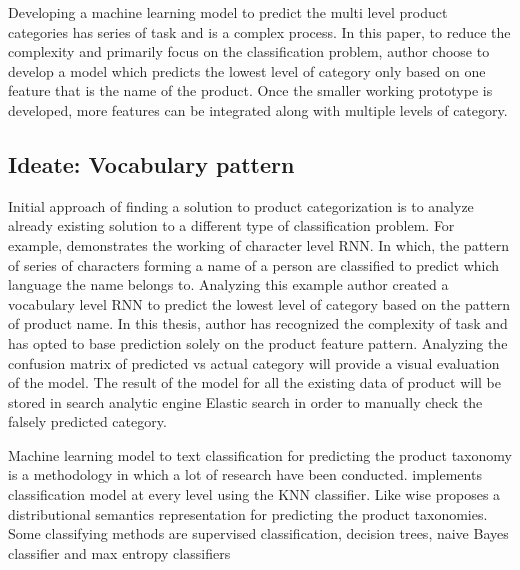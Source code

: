 Developing a machine learning model to predict the multi level product categories has series of task and is a complex process. In this paper, to reduce the complexity and primarily focus on the classification problem, author choose to develop a model which predicts the lowest level of category only based on one feature that is the name of the product. Once the smaller working prototype is developed, more features can be integrated along with multiple levels of category. 


\subsection{Ideate: Vocabulary pattern}
Initial approach of finding a solution to product categorization is to analyze already existing solution to a different type of classification problem. For example, \parencite{sean} demonstrates the working of character level RNN. In which, the pattern of series of characters forming a name of a person are classified to predict which language the name belongs to. Analyzing this example author created a vocabulary level RNN to predict the lowest level of category based on the pattern of product name. In this thesis, author has recognized the complexity of task and has opted to base prediction solely on the product feature pattern. Analyzing the confusion matrix of predicted vs actual category will provide a visual evaluation of the model. The result of the model for all the existing data of product will be stored in search analytic engine Elastic search in order to manually check the falsely predicted category.

Machine learning model to text classification for predicting the product taxonomy is a methodology in which a lot of research have been conducted. \cite{AliCevahir.} implements classification model at every level using the \acl*{KNN} classifier. Like wise \parencite{Gupta.20062016}  proposes a distributional semantics representation for predicting the product taxonomies.  Some classifying methods are supervised classification, decision trees, naive Bayes classifier and max entropy classifiers \parencite{BirdKleinLoper09}

